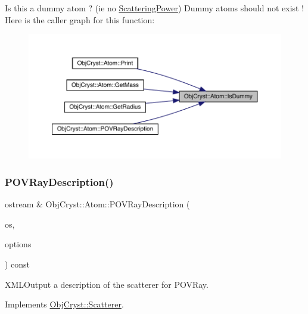 Is this a dummy atom ? (ie no \mbox{\hyperlink{class_obj_cryst_1_1_scattering_power}{Scattering\+Power}}) Dummy atoms should not exist ! Here is the caller graph for this function\+:
\nopagebreak
\begin{figure}[H]
\begin{center}
\leavevmode
\includegraphics[width=350pt]{class_obj_cryst_1_1_atom_a5f5aaf79fba4a85a0b2af58e817c3460_icgraph}
\end{center}
\end{figure}
\mbox{\label{class_obj_cryst_1_1_atom_aaf6475195502fff91903f30b5c6c3345}} 
\subsubsection{\texorpdfstring{POVRayDescription()}{POVRayDescription()}}
{\footnotesize\ttfamily ostream \& Obj\+Cryst\+::\+Atom\+::\+P\+O\+V\+Ray\+Description (\begin{DoxyParamCaption}\item[{ostream \&}]{os,  }\item[{const \mbox{\hyperlink{struct_obj_cryst_1_1_crystal_p_o_v_ray_options}{Crystal\+P\+O\+V\+Ray\+Options}} \&}]{options }\end{DoxyParamCaption}) const\hspace{0.3cm}{\ttfamily [virtual]}}



X\+M\+L\+Output a description of the scatterer for P\+O\+V\+Ray. 



Implements \mbox{\hyperlink{class_obj_cryst_1_1_scatterer}{Obj\+Cryst\+::\+Scatterer}}.


